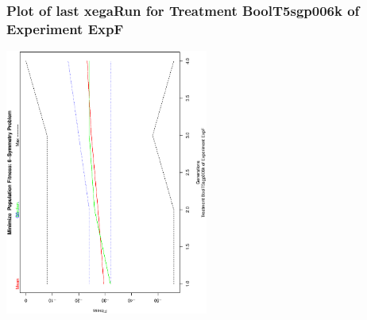  \begin{frame}
 \frametitle{ Plot of last xegaRun for Treatment BoolT5sgp006k of Experiment ExpF }
 \begin{center}
\includegraphics[width=0.5\textwidth, angle=-90]
{ExpFPlotPopStatsFigure004.eps}
 \end{center}
 \label{templateReport/ExpFPlotPopStatsFigure004.eps}  
 \end{frame}

